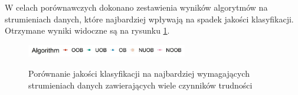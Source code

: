 \noindent W celach porównawczych dokonano zestawienia wyników algorytmów na strumieniach danych, które najbardziej wpływają na spadek jakości klasyfikacji. Otrzymane wyniki widoczne są na rysunku \ref{Figure:ComplexComparison}.

\begin{figure}[h]
    \centering
    \includegraphics[width=7cm]{figures/algorithms_legend.JPG}
\end{figure}

\vspace{-1.2cm}

\begin{figure}[h]
    \centering
    \qquad
    \caption{Porównanie jakości klasyfikacji na najbardziej wymagających strumieniach danych zawierających wiele czynników trudności}\label{Figure:ComplexComparison}
\end{figure}

